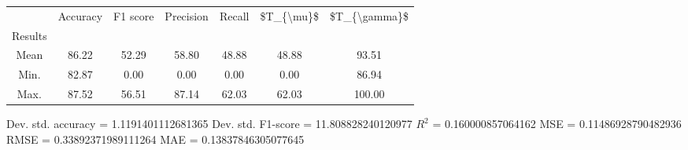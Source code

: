\begin{tabular}{|c|c|c|c|c|c|c|}
\toprule
{} &  Accuracy &  F1 score &  Precision &  Recall &  \$T\_\{\textbackslash mu\}\$ &  \$T\_\{\textbackslash gamma\}\$ \\
Results &           &           &            &         &            &               \\
\hline
Mean    &     86.22 &     52.29 &      58.80 &   48.88 &      48.88 &         93.51 \\
Min.    &     82.87 &      0.00 &       0.00 &    0.00 &       0.00 &         86.94 \\
Max.    &     87.52 &     56.51 &      87.14 &   62.03 &      62.03 &        100.00 \\
\bottomrule
\end{tabular}

 Dev. std. accuracy = 1.1191401112681365
 Dev. std. F1-score = 11.808828240120977
 $R^2$ = 0.160000857064162
 MSE = 0.11486928790482936
 RMSE = 0.33892371989111264
 MAE = 0.13837846305077645